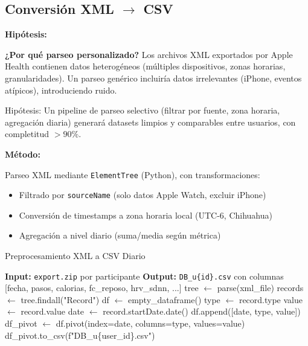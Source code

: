 \documentclass[12pt,letterpaper,twoside]{report}
\begin{document}
\subsection{Conversión XML $\to$ CSV}

\begin{hipotesisbox}
\textbf{Hipótesis:}

\textbf{¿Por qué parseo personalizado?} Los archivos XML exportados por Apple Health contienen datos heterogéneos (múltiples dispositivos, zonas horarias, granularidades). Un parseo genérico incluiría datos irrelevantes (iPhone, eventos atípicos), introduciendo ruido.

Hipótesis: Un pipeline de parseo selectivo (filtrar por fuente, zona horaria, agregación diaria) generará datasets limpios y comparables entre usuarios, con completitud $> 90\%$.
\end{hipotesisbox}

\begin{estadisticobox}
\textbf{Método:}

Parseo XML mediante \texttt{ElementTree} (Python), con transformaciones:
\begin{itemize}[noitemsep]
    \item Filtrado por \texttt{sourceName} (solo datos Apple Watch, excluir iPhone)
    \item Conversión de timestamps a zona horaria local (UTC-6, Chihuahua)
    \item Agregación a nivel diario (suma/media según métrica)
\end{itemize}
\end{estadisticobox}

\begin{algorithm}[H]
\caption{Preprocesamiento XML a CSV Diario}
\label{alg:xml_to_csv}
\begin{algorithmic}[1]
\State \textbf{Input:} \texttt{export.zip} por participante
\State \textbf{Output:} \texttt{DB\_u\{id\}.csv} con columnas [fecha, pasos, calorias, fc\_reposo, hrv\_sdnn, ...]
\State
{}
    \State tree $\gets$ parse(xml\_file)
    \State records $\gets$ tree.findall("Record")
    \State df $\gets$ empty\_dataframe()
            \State type $\gets$ record.type
            \State value $\gets$ record.value
            \State date $\gets$ record.startDate.date()
            \State df.append([date, type, value])
        \EndIf
    \EndFor
    \State df\_pivot $\gets$ df.pivot(index=date, columns=type, values=value)
    \State df\_pivot.to\_csv(f"DB\_u\{user\_id\}.csv")
\EndProcedure
\end{algorithmic}
\end{algorithm}
\end{document}
